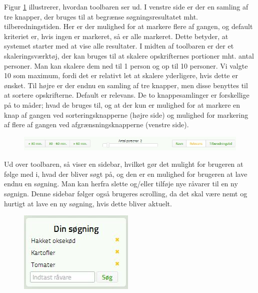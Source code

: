 Figur \ref{fig:foodl-toolbar} illustrerer, hvordan toolbaren ser ud. I venstre side er der en samling af tre knapper, der bruges til at begrænse søgningsresultatet mht. tilberedningstiden. Her er der mulighed for at markere flere af gangen, og default kriteriet er, hvis ingen er markeret, så er alle markeret. Dette betyder, at systemet starter med at vise alle resultater. I midten af toolbaren er der et skaleringsværktøj, der kan bruges til at skalere opskrifternes portioner mht. antal personer. Man kan skalere dem ned til 1 person og op til 10 personer. Vi valgte 10 som maximum, fordi det er relativt let at skalere yderligere, hvis dette er ønsket. Til højre er der endnu en samling af tre knapper, men disse benyttes til at sortere opskrifterne. Default er relevans. De to knappesamlinger er forskellige på to måder; hvad de bruges til, og at der kun er mulighed for at markere en knap af gangen ved sorteringsknapperne (højre side) og mulighed for markering af flere af gangen ved afgrænsningsknapperne (venstre side).

\begin{figure}[H]
	\centering
	\includegraphics[scale=0.7]{billeder/foodl/toolbar.jpg}
	\label{fig:foodl-toolbar}
\end{figure}

Ud over toolbaren, så viser  en sidebar, hvilket gør det mulight for brugeren at følge med i, hvad der bliver søgt på, og den er en mulighed for brugeren at lave endnu en søgning. Man kan herfra slette og/eller tilføje nye råvarer til en ny søgnign. Denne sidebar følger også brugeres scrolling, da det skal være nemt og hurtigt at lave en ny søgning, hvis dette bliver aktuelt.

\begin{figure}[H]
	\centering
	\includegraphics[scale=0.7]{billeder/foodl/sidebar.jpg}
	\label{fig:foodl-sidebar}
\end{figure}

